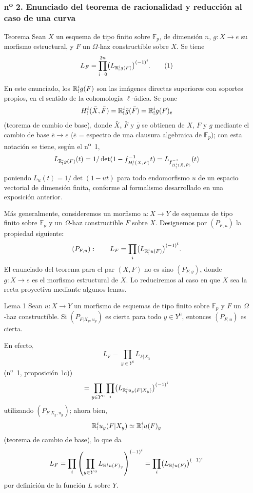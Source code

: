 \subsubsection*{n\textsuperscript{o} 2. Enunciado del teorema de racionalidad y reducción al caso de una curva}

\begin{statement}{Teorema}
Sean $X$ un esquema de tipo finito sobre $\mathbb F_p$, de dimensión $n$, $g:X\to e$ su morfismo estructural, y $F$ un $\Omega$-haz constructible sobre $X$. Se tiene
\[
L_F=\prod_{i=0}^{2n}\bigl(L_{\mathbb{R}^i_!g(F)}\bigr)^{(-1)^i}.
\tag{1}
\]
\end{statement}

En este enunciado, los $\mathbb{R}^i_!g(F)$ son las imágenes directas superiores con soportes propios, en el sentido de la cohomología $\ell$-ádica. Se pone
\[
H^i_!(\bar X,\bar F)=\mathbb{R}^i_!\bar g(\bar F)=\mathbb{R}^i_!g(F)_{\bar e}
\]
(teorema de cambio de base), donde $\bar X$, $\bar F$ y $\bar g$ se obtienen de $X$, $F$ y $g$ mediante el cambio de base $\bar e\to e$ ($\bar e$ = espectro de una clausura algebraica de $\mathbb F_p$); con esta notación se tiene, según el n\textsuperscript{o}~1,
\[
L_{\mathbb{R}^i_!g(F)}(t)=1/\det(1-f^{-1}_{H^i_!(\bar X,\bar F)}t)
 =L_{f^{-1}_{H^i_!(\bar X,\bar F)}}(t)
\]
poniendo $L_u(t)=1/\det(1-ut)$ para todo endomorfismo $u$ de un espacio vectorial de dimensión finita, conforme al formalismo desarrollado en una exposición anterior.

Más generalmente, consideremos un morfismo $u:X\to Y$ de esquemas de tipo finito sobre $\mathbb F_p$ y un $\Omega$-haz constructible $F$ sobre $X$. Designemos por $(P_{F,u})$ la propiedad siguiente:
\[
(P_{F,u}):\qquad
L_F=\prod_i\bigl(L_{\mathbb{R}^i_!u(F)}\bigr)^{(-1)^i}.
\]
El enunciado del teorema para el par $(X,F)$ no es sino $(P_{F,g})$, donde $g:X\to e$ es el morfismo estructural de $X$. Lo reduciremos al caso en que $X$ sea la recta proyectiva mediante algunos lemas.

\begin{statement}{Lema 1}
Sean $u:X\to Y$ un morfismo de esquemas de tipo finito sobre $\mathbb F_p$ y $F$ un $\Omega$-haz constructible. Si $(P_{F|X_y,u_y})$ es cierta para todo $y\in Y^0$, entonces $(P_{F,u})$ es cierta.
\end{statement}

En efecto,
\[
L_F=\prod_{y\in Y^0}L_{F|X_y}
\]
(n\textsuperscript{o}~1, proposición 1c))
\[
=\prod_{y\in Y^0}\prod_i\bigl(L_{\mathbb{R}^i_!u_y(F|X_y)}\bigr)^{(-1)^i}
\]
utilizando $(P_{F|X_y,u_y})$; ahora bien,
\[
\mathbb{R}^i_!u_y(F|X_y)\simeq \mathbb{R}^i_!u(F)_y
\]
(teorema de cambio de base), lo que da
\[
L_F=\prod_i\left(\prod_{y\in Y^0}L_{\mathbb{R}^i_!u(F)_y}\right)^{(-1)^i}
=\prod_i\bigl(L_{\mathbb{R}^i_!u(F)}\bigr)^{(-1)^i}
\]
por definición de la función $L$ sobre $Y$.
